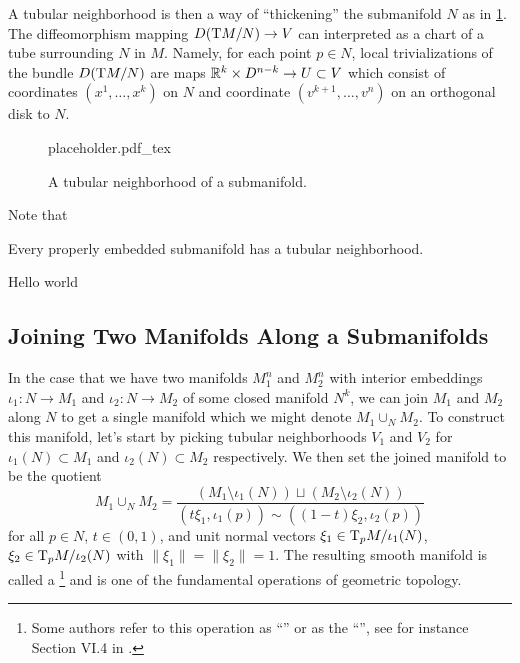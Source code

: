 A tubular neighborhood is then a way of ``thickening'' the submanifold $N$ as in \cref{fig:tubular-neighborhood}.
The diffeomorphism mapping $D(\mathrm{T} M/N) \to V$ can interpreted as a chart of a tube surrounding $N$ in $M$. Namely, for each point $p\in N$, local trivializations of the bundle $D(\mathrm{T} M/N)$ are maps $\mathbb{R}^k \times D^{n-k}\to U\subset V$ which consist of coordinates $(x^1,\ldots,x^k)$ on $N$ and coordinate $(v^{k+1},\ldots, v^{n})$ on an orthogonal disk to $N$.

\begin{figure}[ht]
	\centering
	{placeholder.pdf_tex}
	\caption{A tubular neighborhood of a submanifold.}\label{fig:tubular-neighborhood}
\end{figure}

\begin{remark}
	Note that 
\end{remark}



\begin{theorem}\label{thm:tubular-neighborhood}
	Every properly embedded submanifold has a tubular neighborhood.
\end{theorem}

\begin{theorem}\label{thm:collar-neighborhood}
	Hello world
\end{theorem}


\subsection{Joining Two Manifolds Along a Submanifolds}

In the case that we have two manifolds $M_1^n$ and $M_2^n$ with interior embeddings $\iota_1 : N \to M_1$ and $\iota_2 : N\to M_2$ of some closed manifold $N^k$, we can join $M_1$ and $M_2$ along $N$ to get a single manifold which we might denote $M_1\cup_N M_2$.
To construct this manifold, let's start by picking tubular neighborhoods $V_1$ and $V_2$ for $\iota_1(N)\subset M_1$ and $\iota_2(N)\subset M_2$ respectively. We then set the joined manifold to be the quotient
\begin{equation}\label{eq:join-definition}
	M_1\cup_N M_2 = \frac{(M_1\setminus \iota_1(N))\sqcup (M_2\setminus \iota_2(N))}{(t\xi_1, \iota_1(p)) \sim ((1-t)\xi_2, \iota_2(p))}
\end{equation}
for all $p\in N$, $t\in(0,1)$, and unit normal vectors $\xi_1\in \mathrm{T}_p M/\iota_1(N)$, $\xi_2\in \mathrm{T}_p M/\iota_2(N)$ with $\|\xi_1\|=\|\xi_2\|=1$. The resulting smooth manifold is called a \footnote{Some authors refer to this operation as ``'' or as the ``'', see for instance Section VI.4 in \cite{kosinski1993differential}.} and is one of the fundamental operations of geometric topology.

